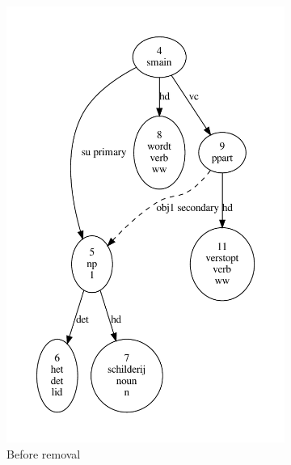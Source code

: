 \begin{figure}[t]
    \begin{subfigure}[t]{0.49\textwidth}
        \centering
        \includegraphics[scale=0.49]{Figures/abs1.pdf}
        \caption{Before removal}
        \end{subfigure}
    \begin{subfigure}[t]{0.49\textwidth}
        \centering

\end{subfigure}
\end{figure}
